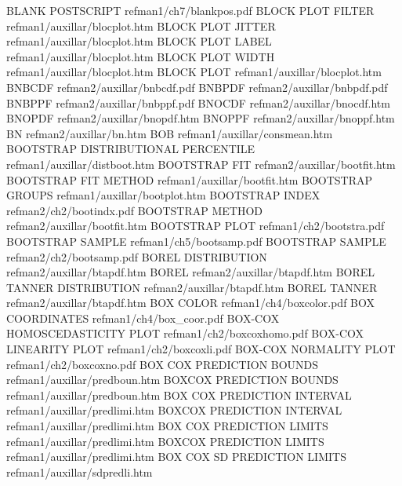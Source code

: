 BLANK POSTSCRIPT                        refman1/ch7/blankpos.pdf
BLOCK PLOT FILTER                       refman1/auxillar/blocplot.htm
BLOCK PLOT JITTER                       refman1/auxillar/blocplot.htm
BLOCK PLOT LABEL                        refman1/auxillar/blocplot.htm
BLOCK PLOT WIDTH                        refman1/auxillar/blocplot.htm
BLOCK PLOT                              refman1/auxillar/blocplot.htm
BNBCDF                                  refman2/auxillar/bnbcdf.pdf
BNBPDF                                  refman2/auxillar/bnbpdf.pdf
BNBPPF                                  refman2/auxillar/bnbppf.pdf
BNOCDF                                  refman2/auxillar/bnocdf.htm
BNOPDF                                  refman2/auxillar/bnopdf.htm
BNOPPF                                  refman2/auxillar/bnoppf.htm
BN                                      refman2/auxillar/bn.htm
BOB                                     refman1/auxillar/consmean.htm
BOOTSTRAP DISTRIBUTIONAL PERCENTILE     refman1/auxillar/distboot.htm
BOOTSTRAP FIT                           refman2/auxillar/bootfit.htm
BOOTSTRAP FIT METHOD                    refman1/auxillar/bootfit.htm
BOOTSTRAP GROUPS                        refman1/auxillar/bootplot.htm
BOOTSTRAP INDEX                         refman2/ch2/bootindx.pdf
BOOTSTRAP METHOD                        refman2/auxillar/bootfit.htm
BOOTSTRAP PLOT                          refman1/ch2/bootstra.pdf
BOOTSTRAP SAMPLE                        refman1/ch5/bootsamp.pdf
BOOTSTRAP SAMPLE                        refman2/ch2/bootsamp.pdf
BOREL DISTRIBUTION                      refman2/auxillar/btapdf.htm
BOREL                                   refman2/auxillar/btapdf.htm
BOREL TANNER DISTRIBUTION               refman2/auxillar/btapdf.htm
BOREL TANNER                            refman2/auxillar/btapdf.htm
BOX COLOR                               refman1/ch4/boxcolor.pdf
BOX COORDINATES                         refman1/ch4/box_coor.pdf
BOX-COX HOMOSCEDASTICITY PLOT           refman1/ch2/boxcoxhomo.pdf
BOX-COX LINEARITY PLOT                  refman1/ch2/boxcoxli.pdf
BOX-COX NORMALITY PLOT                  refman1/ch2/boxcoxno.pdf
BOX COX PREDICTION BOUNDS               refman1/auxillar/predboun.htm
BOXCOX PREDICTION BOUNDS                refman1/auxillar/predboun.htm
BOX COX PREDICTION INTERVAL             refman1/auxillar/predlimi.htm
BOXCOX PREDICTION INTERVAL              refman1/auxillar/predlimi.htm
BOX COX PREDICTION LIMITS               refman1/auxillar/predlimi.htm
BOXCOX PREDICTION LIMITS                refman1/auxillar/predlimi.htm
BOX COX SD PREDICTION LIMITS            refman1/auxillar/sdpredli.htm
